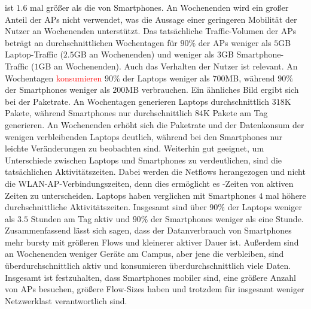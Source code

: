 \documentclass[12pt, a4paper]{article}
\begin{document}
ist $1.6$ mal größer als die von Smartphones. An Wochenenden wird ein großer Anteil der APs nicht verwendet,
was die Aussage einer geringeren Mobilität der Nutzer an Wochenenden unterstützt.
Das tatsächliche Traffic-Volumen der APs beträgt an durchschnittlichen Wochentagen für $90 \%$ der APs
weniger als $5$\textsc{GB} Laptop-Traffic ($2.5$\textsc{GB} an Wochenenden) und weniger als $3$\textsc{GB} Smartphone-Traffic
($1$\textsc{GB} an Wochenenden).
Auch das Verhalten der Nutzer ist relevant. An Wochentagen \textcolor{red}{konsumieren} $90 \%$ der Laptops weniger als $700$\textsc{MB},
während $90 \%$ der Smartphones weniger als $200$\textsc{MB} verbrauchen.
Ein ähnliches Bild ergibt sich bei der Paketrate. An Wochentagen generieren Laptops durchschnittlich $318$\textsc{K} Pakete, 
während Smartphones nur durchschnittlich $84$\textsc{K} Pakete am Tag generieren. 
An Wochenenden erhöht sich die Paketrate und der Datenkonsum der wenigen verbleibenden Laptops deutlich,
während bei den Smartphones nur leichte Veränderungen zu beobachten sind.
Weiterhin gut geeignet, um Unterschiede zwischen Laptops und Smartphones zu verdeutlichen, sind die tatsächlichen Aktivitätszeiten.
Dabei werden die Netflows herangezogen und nicht die WLAN-AP-Verbindungszeiten, denn dies ermöglicht es -Zeiten
von aktiven Zeiten zu unterscheiden. Laptops haben verglichen mit Smartphones $4$ mal höhere durchschnittliche Aktivitätszeiten.
Insgesamt sind über $90 \%$ der Laptops weniger als $3.5$ Stunden am Tag aktiv und $90 \%$ der Smartphones weniger als eine Stunde.\newline
Zusammenfassend lässt sich sagen, dass der Datanverbrauch von Smartphones mehr bursty mit größeren Flows und kleinerer aktiver
Dauer ist. Außerdem sind an Wochenenden weniger Geräte am Campus, aber jene die verbleiben, sind überdurchschnittlich aktiv 
und konsumieren überdurchschnittlich viele Daten. Insgesamt ist festzuhalten, dass Smartphones mobiler sind, 
eine größere Anzahl von APs besuchen, größere Flow-Sizes haben und trotzdem für insgesamt weniger Netzwerklast 
verantwortlich sind.
\end{document}
